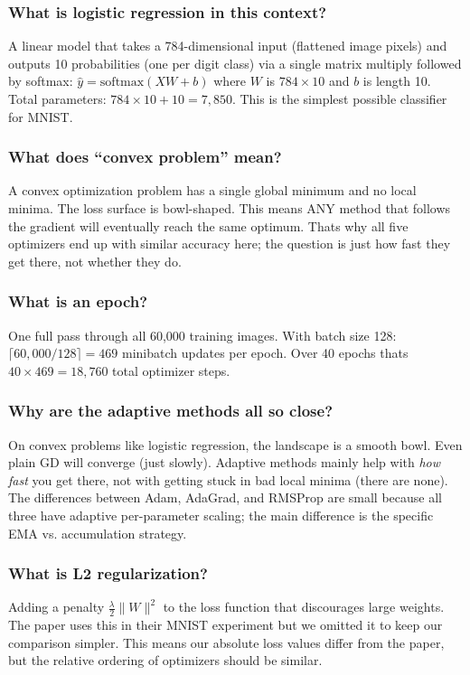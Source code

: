 \documentclass[11pt, letterpaper]{article}
\begin{document}
\begin{deepdive}
\subsubsection{What is logistic regression in this context?}
A linear model that takes a 784-dimensional input (flattened image pixels) and outputs 10 probabilities (one per digit class) via a single matrix multiply followed by softmax: $\hat{y} = \text{softmax}(XW + b)$ where $W$ is $784 \times 10$ and $b$ is length 10. Total parameters: $784 \times 10 + 10 = 7{,}850$. This is the simplest possible classifier for MNIST.

\subsubsection{What does ``convex problem'' mean?}
A convex optimization problem has a single global minimum and no local minima. The loss surface is bowl-shaped. This means ANY method that follows the gradient will eventually reach the same optimum. Thats why all five optimizers end up with similar accuracy here; the question is just how fast they get there, not whether they do.

\subsubsection{What is an epoch?}
One full pass through all 60,000 training images. With batch size 128: $\lceil 60{,}000 / 128 \rceil = 469$ minibatch updates per epoch. Over 40 epochs thats $40 \times 469 = 18{,}760$ total optimizer steps.

\subsubsection{Why are the adaptive methods all so close?}
On convex problems like logistic regression, the landscape is a smooth bowl. Even plain GD will converge (just slowly). Adaptive methods mainly help with \textit{how fast} you get there, not with getting stuck in bad local minima (there are none). The differences between Adam, AdaGrad, and RMSProp are small because all three have adaptive per-parameter scaling; the main difference is the specific EMA vs. accumulation strategy.

\subsubsection{What is L2 regularization?}
Adding a penalty $\frac{\lambda}{2}\|W\|^2$ to the loss function that discourages large weights. The paper uses this in their MNIST experiment but we omitted it to keep our comparison simpler. This means our absolute loss values differ from the paper, but the relative ordering of optimizers should be similar.
\end{deepdive}
\end{document}

